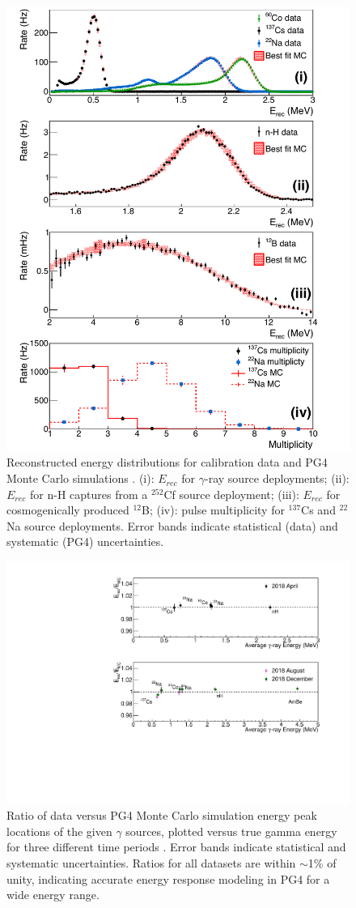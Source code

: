 \begin{figure}[H]
	\centering
	\includegraphics[width=0.65\linewidth]{tex/5-analysis-images/GammaE}
	\caption{Reconstructed energy distributions for calibration data and PG4 Monte Carlo simulations \cite{XZhang:2815}. (i): $E_{rec}$ for $\gamma$-ray source deployments; (ii): $E_{rec}$ for n-H captures from a $^{252}$Cf source deployment; (iii): $E_{rec}$ for cosmogenically produced $^{12}$B; (iv): pulse multiplicity for $^{137}$Cs and $^{22}$Na source deployments. Error bands indicate statistical (data) and systematic (PG4) uncertainties.}
	\label{fig:gammae}
\end{figure}

\begin{figure}[H]
	\centering
	\includegraphics[width=0.8\linewidth]{tex/5-analysis-images/GammaScale}
	\caption{Ratio of data versus PG4 Monte Carlo simulation energy peak locations of the given $\gamma$ sources, plotted versus true gamma energy for three different time periods \cite{XZhang:2815}. Error bands indicate statistical and systematic uncertainties. Ratios for all datasets are within $\sim$1\% of unity, indicating accurate energy response modeling in PG4 for a wide energy range.}
	\label{fig:gammascale}
\end{figure}

